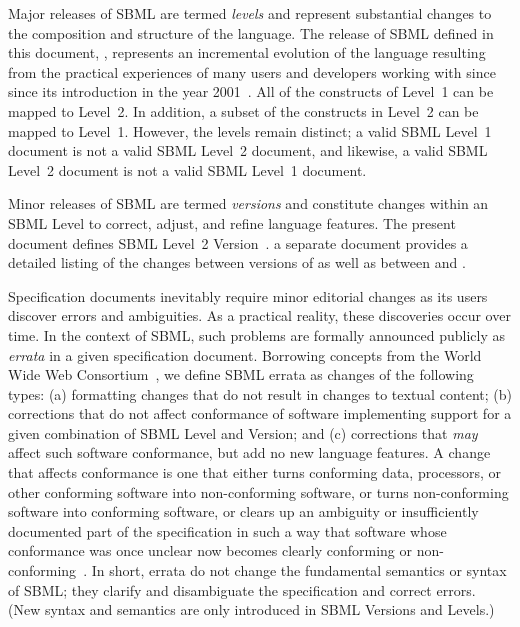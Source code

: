 Major releases of SBML are termed \emph{levels} and represent
substantial changes to the composition and structure of the
language.  The release of SBML defined in this document, \sbmltwo,
represents an incremental evolution of the language resulting from
the practical experiences of many users and developers working
with \sbmlone since since its introduction in the year
2001~\citep{hucka:2001,hucka:2003}.  All of the constructs of
Level~1 can be mapped to Level~2.  In addition, a subset of the
constructs in Level~2 can be mapped to Level~1.  However, the
levels remain distinct; a valid SBML Level~1 document is not a
valid SBML Level~2 document, and likewise, a valid SBML Level~2
document is not a valid SBML Level~1 document.

Minor releases of SBML are termed \emph{versions} and constitute
changes within an SBML Level to correct, adjust, and refine
language features.  The present document defines SBML Level~2
Version~.   a separate document provides a detailed
listing of the changes between versions of \sbmltwo as well as
between \changed{\sbmltwothree} and \sbmlonetwo.

Specification documents inevitably require minor editorial changes
as its users discover errors and ambiguities.  As a practical
reality, these discoveries occur over time.  In the context of
SBML, such problems are formally announced publicly as
\emph{errata} in a given specification document.  Borrowing
concepts from the World Wide Web Consortium~\citep{jacobs:2004},
we define SBML errata as changes of the following types: (a)
formatting changes that do not result in changes to textual
content; (b) corrections that do not affect conformance of
software implementing support for a given combination of SBML
Level and Version; and (c) corrections that \emph{may} affect such
software conformance, but add no new language features.  A change
that affects conformance is one that either turns conforming data,
processors, or other conforming software into non-conforming
software, or turns non-conforming software into conforming
software, or clears up an ambiguity or insufficiently documented
part of the specification in such a way that software whose
conformance was once unclear now becomes clearly conforming or
non-conforming~\citep{jacobs:2004}.  In short, errata do not
change the fundamental semantics or syntax of SBML; they clarify
and disambiguate the specification and correct errors.  (New
syntax and semantics are only introduced in SBML Versions and
Levels.)

